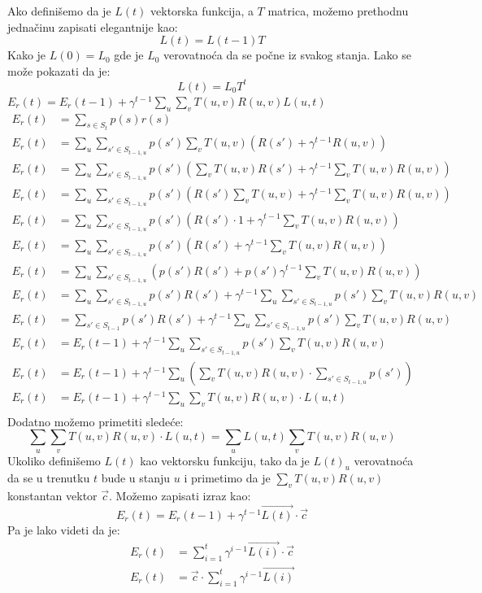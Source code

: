 \documentclass[a4paper,fleqn,12pt]{JMThesis}
\theoremstyle{plain}
\theoremstyle{definition}
\theoremstyle{definition}
\begin{document}
Ako definišemo da je $L(t)$ vektorska funkcija, a $T$ matrica, možemo prethodnu jednačinu zapisati elegantnije kao:
\[ L(t) = L(t-1)T \]
Kako je $L(0) = L_0$ gde je $L_0$ verovatnoća da se počne iz svakog stanja. Lako se može pokazati da je:
\[ L(t) = L_0T^t \]
\lem $E_r(t) = E_r(t-1) + \gamma^{t-1}\sum_{u}\sum_{v}T(u,v)R(u,v)L(u,t)$
\[
\begin{split}
	E_r(t) &= \sum_{s \in S_t}p(s)r(s)	\\
	E_r(t) &= \sum_u \sum_{s' \in S_{t-1,u}}p(s')\sum_{v}T(u,v)(R(s') + \gamma^{t-1} R(u,v))\\
	E_r(t) &= \sum_u \sum_{s' \in S_{t-1,u}}p(s')(\sum_{v}T(u,v)R(s') + \gamma^{t-1} \sum_{v}T(u,v)R(u,v))\\
	E_r(t) &= \sum_u \sum_{s' \in S_{t-1,u}}p(s')(R(s')\sum_{v}T(u,v) + \gamma^{t-1} \sum_{v}T(u,v)R(u,v))\\
	E_r(t) &= \sum_u \sum_{s' \in S_{t-1,u}}p(s')(R(s')\cdot 1 + \gamma^{t-1} \sum_{v}T(u,v)R(u,v))\\
	E_r(t) &= \sum_u \sum_{s' \in S_{t-1,u}}p(s')(R(s') + \gamma^{t-1} \sum_{v}T(u,v)R(u,v))\\
	E_r(t) &= \sum_u \sum_{s' \in S_{t-1,u}}\left(p(s')R(s') + p(s')\gamma^{t-1}\sum_{v}T(u,v)R(u,v)\right)\\
	E_r(t) &= \sum_u \sum_{s' \in S_{t-1,u}}p(s')R(s') + \gamma^{t-1}\sum_u \sum_{s' \in S_{t-1,u}}p(s')\sum_{v}T(u,v)R(u,v)\\
	E_r(t) &= \sum_{s' \in S_{t-1}}p(s')R(s') + \gamma^{t-1}\sum_u \sum_{s' \in S_{t-1,u}}p(s')\sum_{v}T(u,v)R(u,v)\\
	E_r(t) &= E_r(t-1) + \gamma^{t-1}\sum_u \sum_{s' \in S_{t-1,u}}p(s')\sum_{v}T(u,v)R(u,v)\\
	E_r(t) &= E_r(t-1) + \gamma^{t-1}\sum_u \left(\sum_{v}T(u,v)R(u,v) \cdot \sum_{s' \in S_{t-1,u}}p(s')\right)\\
	E_r(t) &= E_r(t-1) + \gamma^{t-1}\sum_u \sum_{v}T(u,v)R(u,v) \cdot L(u,t)\\
\end{split}
\]
Dodatno možemo primetiti sledeće:
\[
	\sum_u \sum_{v}T(u,v)R(u,v) \cdot L(u,t) = \sum_u L(u,t)\sum_{v}T(u,v)R(u,v)
\]
Ukoliko definišemo $L(t)$ kao vektorsku funkciju, tako da je $L(t)_u$ verovatnoća da se u trenutku $t$ bude u stanju $u$ i primetimo da je $\sum_{v}T(u,v)R(u,v)$ konstantan vektor $\vec{c}$.
Možemo zapisati izraz kao:
\[
	E_r(t) = E_r(t-1) + \gamma^{t-1}\vec{L(t)} \cdot \vec{c}
\]  
Pa je lako videti da je:
\[
	\begin{split}
	E_r(t) &= \sum_{i=1}^{t}\gamma^{i-1}\vec{L(i)} \cdot \vec{c}\\
	E_r(t) &= \vec{c} \cdot \sum_{i=1}^{t}\gamma^{i-1}\vec{L(i)}
	\end{split}
\]
\end{document}
